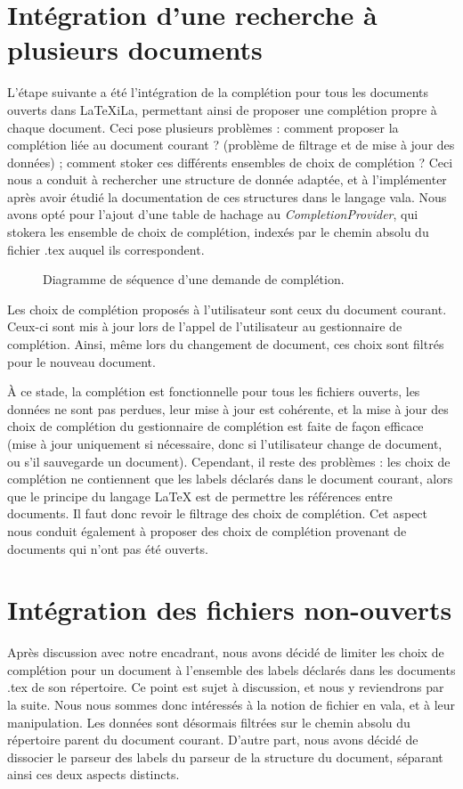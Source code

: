 \documentclass[a4paper,11pt]{report}
\begin{document}
\section{Intégration d'une recherche à plusieurs documents}
L'étape suivante a été l'intégration de la complétion pour tous les documents ouverts dans LaTeXiLa, permettant ainsi de proposer une complétion propre à chaque document.
Ceci pose plusieurs problèmes : comment proposer la complétion liée au document courant ? (problème de filtrage et de mise à jour des données) ; comment stoker ces différents ensembles de choix de complétion ?
Ceci nous a conduit à rechercher une structure de donnée adaptée, et à l'implémenter après avoir étudié la documentation de ces structures dans le langage vala.
Nous avons opté pour l'ajout d'une table de hachage au \textit{CompletionProvider}, qui stokera les ensemble de choix de complétion, indexés par le chemin absolu du fichier .tex auquel ils correspondent.

\begin{figure}[h]
\label{fig:filtering_completion}
\centering

\caption{Diagramme de séquence d'une demande de complétion.}
\end{figure}

Les choix de complétion proposés à l'utilisateur sont ceux du document courant.
Ceux-ci sont mis à jour lors de l'appel de l'utilisateur au gestionnaire de complétion. Ainsi, même lors du changement de document, ces choix sont filtrés pour le nouveau document.

À ce stade, la complétion est fonctionnelle pour tous les fichiers ouverts, les données ne sont pas perdues, leur mise à jour est cohérente, et la mise à jour des choix de complétion du gestionnaire de complétion est faite de façon efficace (mise à jour uniquement si nécessaire, donc si l'utilisateur change de document, ou s'il sauvegarde un document).
Cependant, il reste des problèmes : les choix de complétion ne contiennent que les labels déclarés dans le document courant, alors que le principe du langage \LaTeX{} est de permettre les références entre documents.
Il faut donc revoir le filtrage des choix de complétion.
Cet aspect nous conduit également à proposer des choix de complétion provenant de documents qui n'ont pas été ouverts.

\section{Intégration des fichiers non-ouverts}
Après discussion avec notre encadrant, nous avons décidé de limiter les choix de complétion pour un document à l'ensemble des labels déclarés dans les documents .tex de son répertoire.
Ce point est sujet à discussion, et nous y reviendrons par la suite.
Nous nous sommes donc intéressés à la notion de fichier en vala, et à leur manipulation.
Les données sont désormais filtrées sur le chemin absolu du répertoire parent du document courant.
D'autre part, nous avons décidé de dissocier le parseur des labels du parseur de la structure du document, séparant ainsi ces deux aspects distincts.
\end{document}
